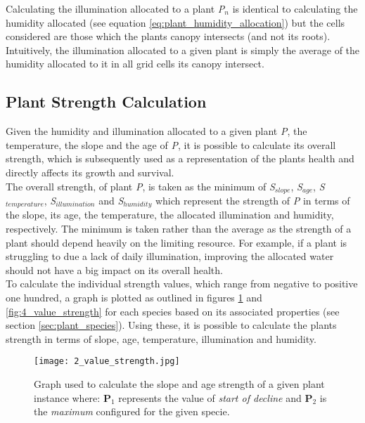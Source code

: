 Calculating the illumination allocated to a plant \textit{P$_{n}$} is identical to calculating the humidity allocated (see equation \ref{eq:plant_humidity_allocation}) but the cells considered are those which the plants canopy intersects (and not its roots). Intuitively, the illumination allocated to a given plant is simply the average of the humidity allocated to it in all grid cells its canopy intersect.

\subsection{Plant Strength Calculation} \label{subsec:plant_strength_calc}

Given the humidity and illumination allocated to a given plant \textit{P}, the temperature, the slope and the age of \textit{P}, it is possible to calculate its overall strength, which is subsequently used as a representation of the plants health and directly affects its growth and survival. \\
The overall strength, of plant \textit{P}, is taken as the minimum of \textit{S$_{slope}$}, \textit{S$_{age}$}, \textit{S$_{temperature}$}, \textit{S$_{illumination}$} and \textit{S$_{humidity}$} which represent the strength of \textit{P} in terms of the slope, its age, the temperature, the allocated illumination and humidity, respectively. The minimum is taken rather than the average as the strength of a plant should depend heavily on the limiting resource. For example, if a plant is struggling to due a lack of daily illumination, improving the allocated water should not have a big impact on its overall health.\\
To calculate the individual strength values, which range from negative to positive one hundred, a graph is plotted as outlined in figures \ref{fig:2_value_strength} and \ref{fig:4_value_strength} for each species based on its associated properties (see section \ref{sec:plant_species}). Using these, it is possible to calculate the plants strength in terms of slope, age, temperature, illumination and humidity.

\begin{figure}
\center
	\texttt{[image: 2\_value\_strength.jpg]}
	\caption{ Graph used to calculate the slope and age strength of a given plant instance where: \textbf{P$_{1}$} represents the value of \textit{start of decline} and \textbf{P$_{2}$} is the \textit{maximum} configured for the given specie. }	
	\label{fig:2_value_strength}
\end{figure}

